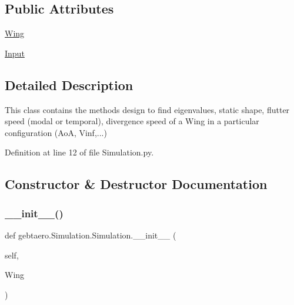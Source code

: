 \subsection*{Public Attributes}
\begin{DoxyCompactItemize}
\item 
\hyperlink{classgebtaero_1_1_simulation_1_1_simulation_a2900b07110293466d8ca5c75ef8e04f8}{Wing}
\item 
\hyperlink{classgebtaero_1_1_simulation_1_1_simulation_ad5005a77e6335eaefeec0af47edc46dc}{Input}
\end{DoxyCompactItemize}


\subsection{Detailed Description}
\begin{DoxyVerb}This class contains the methods design to find eigenvalues, static shape, flutter speed
(modal or temporal), divergence speed of a Wing in a particular configuration (AoA, Vinf,...)
\end{DoxyVerb}
 

Definition at line 12 of file Simulation.\+py.



\subsection{Constructor \& Destructor Documentation}
\mbox{\label{classgebtaero_1_1_simulation_1_1_simulation_a865b25fd48ff7aded232e634e28679c3}} 
\subsubsection{\texorpdfstring{\+\_\+\+\_\+init\+\_\+\+\_\+()}{\_\_init\_\_()}}
{\footnotesize\ttfamily def gebtaero.\+Simulation.\+Simulation.\+\_\+\+\_\+init\+\_\+\+\_\+ (\begin{DoxyParamCaption}\item[{}]{self,  }\item[{}]{Wing }\end{DoxyParamCaption})}



